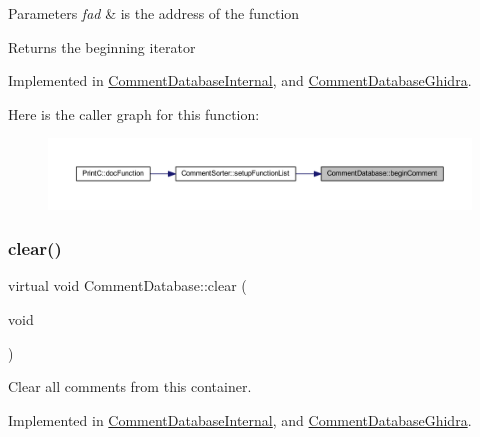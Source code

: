 \begin{DoxyParams}{Parameters}
{\em fad} & is the address of the function \\
\hline
\end{DoxyParams}
\begin{DoxyReturn}{Returns}
the beginning iterator 
\end{DoxyReturn}


Implemented in \mbox{\hyperlink{class_comment_database_internal_a23097880c0ad74fdbe692772957844f6}{Comment\+Database\+Internal}}, and \mbox{\hyperlink{class_comment_database_ghidra_a3fc25277281f61f2aa851b4bbb1e33f1}{Comment\+Database\+Ghidra}}.

Here is the caller graph for this function\+:
\nopagebreak
\begin{figure}[H]
\begin{center}
\leavevmode
\includegraphics[width=350pt]{class_comment_database_a4eb1eb37180fc092244b37ea11f7f2a4_icgraph}
\end{center}
\end{figure}
\mbox{\label{class_comment_database_a11e384fc79f6cf6e8c7af6c608df4baa}} 
\subsubsection{\texorpdfstring{clear()}{clear()}}
{\footnotesize\ttfamily virtual void Comment\+Database\+::clear (\begin{DoxyParamCaption}\item[{void}]{ }\end{DoxyParamCaption})\hspace{0.3cm}{\ttfamily [pure virtual]}}



Clear all comments from this container. 



Implemented in \mbox{\hyperlink{class_comment_database_internal_a19c22a8d1e9ea5ea38c321e778e7c063}{Comment\+Database\+Internal}}, and \mbox{\hyperlink{class_comment_database_ghidra_a723dd4415e6eab6c4b5edacbc97a9332}{Comment\+Database\+Ghidra}}.

